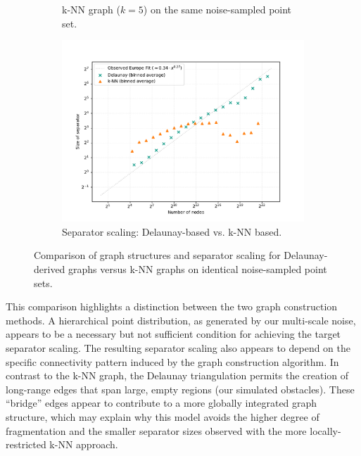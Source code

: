 \begin{figure}[tbhp]
\begin{subfigure}{0.27\linewidth}
        \caption{k-NN graph (\(k=5\)) on the same noise-sampled point set.}
        \label{fig:knn_noise_graph_viz_comp}
    \end{subfigure}
    \hfill
    \begin{subfigure}{0.4\linewidth}
        \centering
        \includegraphics[width=\linewidth]{graphics/noise_knn_vs_rng.pdf}
        \caption{Separator scaling: Delaunay-based vs. k-NN based.}
        \label{fig:knn_delaunay_noise_sep_compare}
    \end{subfigure}
    \caption{Comparison of graph structures and separator scaling for Delaunay-derived graphs versus k-NN graphs on identical noise-sampled point sets.}
    \label{fig:knn_vs_delaunay_noise_points}
\end{figure}

This comparison highlights a distinction between the two graph construction methods.
A hierarchical point distribution, as generated by our multi-scale noise, appears to be a necessary but not sufficient condition for achieving the target separator scaling.
The resulting separator scaling also appears to depend on the specific connectivity pattern induced by the graph construction algorithm.
In contrast to the k-NN graph, the Delaunay triangulation permits the creation of long-range edges that span large, empty regions (our simulated obstacles).
These \enquote{bridge} edges appear to contribute to a more globally integrated graph structure, which may explain why this model avoids the higher degree of fragmentation and the smaller separator sizes observed with the more locally-restricted k-NN approach.
